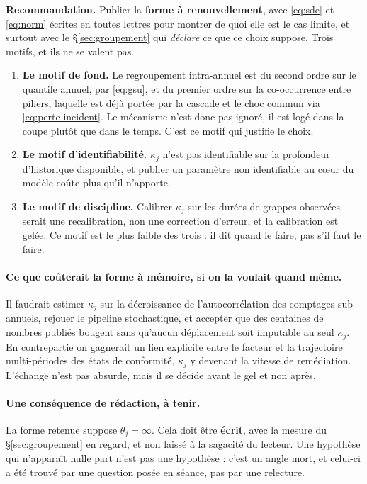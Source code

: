 \documentclass[11pt,a4paper]{article}
\begin{document}
\noindent \textbf{Recommandation.} Publier la \textbf{forme à renouvellement}, avec
\eqref{eq:sde} et \eqref{eq:norm} écrites en toutes lettres pour montrer de quoi elle est le
cas limite, et surtout avec le \S\ref{sec:groupement} qui \emph{déclare} ce que ce choix
suppose. Trois motifs, et ils ne se valent pas.

\begin{enumerate}[itemsep=3pt,topsep=3pt]
\item \textbf{Le motif de fond.} Le regroupement intra-annuel est du second ordre sur le
      quantile annuel, par \eqref{eq:gsu}, et du premier ordre sur la co-occurrence entre
      piliers, laquelle est déjà portée par la cascade et le choc commun via
      \eqref{eq:perte-incident}. Le mécanisme n'est donc pas ignoré, il est logé dans la
      coupe plutôt que dans le temps. C'est ce motif qui justifie le choix.
\item \textbf{Le motif d'identifiabilité.} $\kappa_j$ n'est pas identifiable sur la
      profondeur d'historique disponible, et publier un paramètre non identifiable au cœur
      du modèle coûte plus qu'il n'apporte.
\item \textbf{Le motif de discipline.} Calibrer $\kappa_j$ sur les durées de grappes
      observées serait une recalibration, non une correction d'erreur, et la calibration est
      gelée. Ce motif est le plus faible des trois : il dit quand le faire, pas s'il faut le
      faire.
\end{enumerate}

\paragraph{Ce que coûterait la forme à mémoire, si on la voulait quand même.} Il faudrait
estimer $\kappa_j$ sur la décroissance de l'autocorrélation des comptages sub-annuels,
rejouer le pipeline stochastique, et accepter que des centaines de nombres publiés bougent
sans qu'aucun déplacement soit imputable au seul $\kappa_j$. En contrepartie on gagnerait un
lien explicite entre le facteur et la trajectoire multi-périodes des états de conformité,
$\kappa_j$ y devenant la vitesse de remédiation. L'échange n'est pas absurde, mais il se
décide avant le gel et non après.

\paragraph{Une conséquence de rédaction, à tenir.} La forme retenue suppose
$\theta_j = \infty$. Cela doit être \textbf{écrit}, avec la mesure du
\S\ref{sec:groupement} en regard, et non laissé à la sagacité du lecteur. Une hypothèse qui
n'apparaît nulle part n'est pas une hypothèse : c'est un angle mort, et celui-ci a été trouvé
par une question posée en séance, pas par une relecture.
\end{document}
